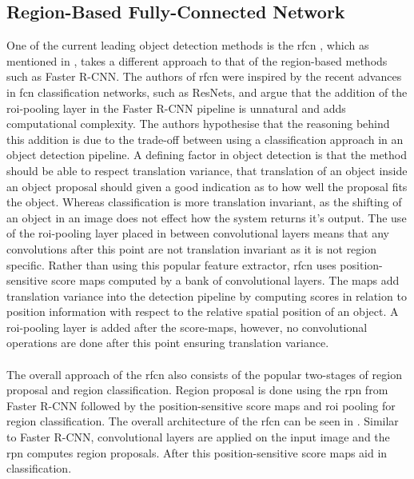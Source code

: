 \subsection{Region-Based Fully-Connected Network}
One of the current leading object detection methods is the \gls{rfcn} \cite{rfcn}, which as mentioned in , takes a different approach to that of the region-based methods such as Faster R-CNN. The authors of \gls{rfcn} were inspired by the recent advances in \gls{fcn} classification networks, such as ResNets, and argue that the addition of the \gls{roi}-pooling layer in the Faster R-CNN pipeline is unnatural and adds computational complexity. The authors hypothesise that the reasoning behind this addition is due to the trade-off between using a classification approach in an object detection pipeline. A defining factor in object detection is that the method should be able to respect translation variance, that translation of an object inside an object proposal should given a good indication as to how well the proposal fits the object. Whereas classification is more translation invariant, as the shifting of an object in an image does not effect how the system returns it's output. The use of the \gls{roi}-pooling layer placed in between convolutional layers means that any convolutions after this point are not translation invariant as it is not region specific. Rather than using this popular feature extractor, \gls{rfcn} uses position-sensitive score maps computed by a bank of convolutional layers. The maps add translation variance into the detection pipeline by computing scores in relation to position information with respect to the relative spatial position of an object. A \gls{roi}-pooling layer is added after the score-maps, however, no convolutional operations are done after this point ensuring translation variance.
\\\\
The overall approach of the \gls{rfcn} also consists of the popular two-stages of region proposal and region classification. Region proposal is done using the \gls{rpn} from Faster R-CNN followed by the position-sensitive score maps and \gls{roi} pooling for region classification. The overall architecture of the \gls{rfcn} can be seen in . Similar to Faster R-CNN, convolutional layers are applied on the input image and the \gls{rpn} computes region proposals. After this position-sensitive score maps aid in classification.


